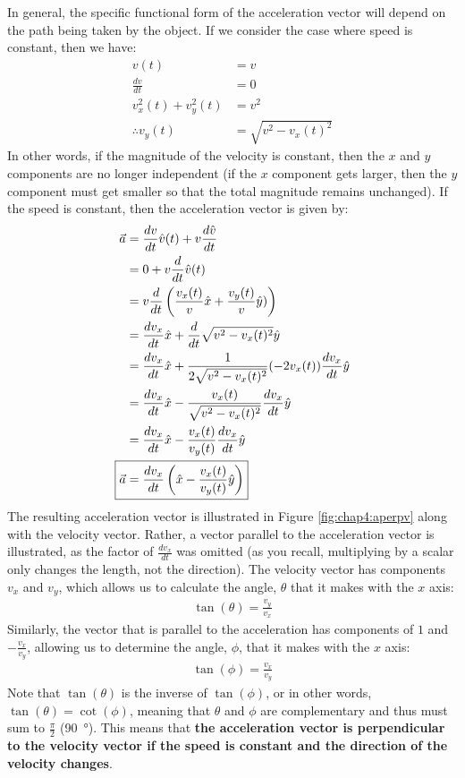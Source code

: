 In general, the specific functional form of the acceleration vector will depend on the path being taken by the object. If we consider the case where speed is constant, then we have:
\begin{align*}
v(t) &= v \\
\frac{dv}{dt}&=0\\
v_x^2(t)+v_y^2(t) &=v^2 \\
\therefore v_y(t)&=\sqrt{v^2-v_x(t)^2}
\end{align*}
In other words, if the magnitude of the velocity is constant, then the $x$ and $y$ components are no longer independent (if the $x$ component gets larger, then the $y$ component must get smaller so that the total magnitude remains unchanged). If the speed is constant, then the acceleration vector is given by:
\begin{align}
\label{eqn:chap4:vecaconstv}
\vec a&=\frac{dv}{dt}\hat v(t)+v\frac{d\hat v}{dt}\nonumber\\
&=0 + v\frac{d}{dt}\hat v(t)\nonumber\\
&=v\frac{d}{dt}\left(\frac{v_x(t)}{v}\hat x+\frac{v_y(t)}{v}\hat y   )\right)\nonumber\\
&=\frac{dv_x}{dt}\hat x + \frac{d}{dt}\sqrt{v^2-v_x(t)^2}\hat y\nonumber\\
&=\frac{dv_x}{dt}\hat x + \frac{1}{2\sqrt{v^2-v_x(t)^2}}(-2v_x(t))\frac{dv_x}{dt}\hat y\nonumber\\
&=\frac{dv_x}{dt}\hat x - \frac{v_x(t)}{\sqrt{v^2-v_x(t)^2}}\frac{dv_x}{dt}\hat y\nonumber\\
&=\frac{dv_x}{dt}\hat x - \frac{v_x(t)}{v_y(t)}\frac{dv_x}{dt}\hat y\nonumber\\
\Aboxed{\vec a&=\frac{dv_x}{dt} \left(\hat x - \frac{v_x(t)}{v_y(t)}\hat y\right)}
\end{align}
The resulting acceleration vector is illustrated in Figure \ref{fig:chap4:aperpv} along with the velocity vector. Rather, a vector parallel to the acceleration vector is illustrated, as the factor of $\frac{dv_x}{dt}$ was omitted (as you recall, multiplying by a scalar only changes the length, not the direction). The velocity vector has components $v_x$ and $v_y$, which allows us to calculate the angle, $\theta$ that it makes with the $x$ axis:
\begin{align*}
\tan(\theta)=\frac{v_y}{v_x}
\end{align*}
Similarly, the vector that is parallel to the acceleration has components of $1$ and $-\frac{v_x}{v_y}$, allowing us to determine the angle, $\phi$, that it makes with the $x$ axis:
\begin{align*}
\tan(\phi)=\frac{v_x}{v_y}
\end{align*}
Note that $\tan(\theta)$ is the inverse of $\tan(\phi)$, or in other words, $\tan(\theta)=\cot(\phi)$, meaning that $\theta$ and $\phi$ are complementary and thus must sum to $\frac{\pi}{2}$ (\SI{90}{\degree}). This means that \textbf{the acceleration vector is perpendicular to the velocity vector if the speed is constant and the direction of the velocity changes}. 

